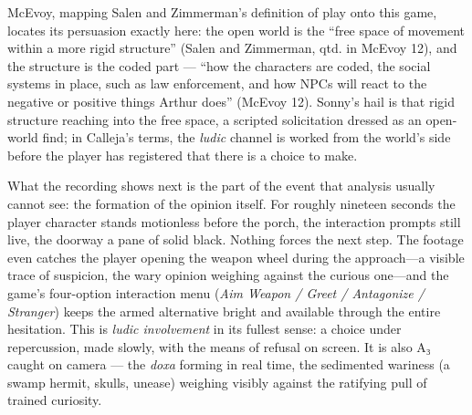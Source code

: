 \documentclass{article}
\begin{document}
McEvoy, mapping Salen and Zimmerman's definition of play onto this game, locates its persuasion exactly here: the open world is the ``free space of movement within a more rigid structure'' (Salen and Zimmerman, qtd. in McEvoy 12), and the structure is the coded part — ``how the characters are coded, the social systems in place, such as law enforcement, and how NPCs will react to the negative or positive things Arthur does'' (McEvoy 12). Sonny's hail is that rigid structure reaching into the free space, a scripted solicitation dressed as an open-world find; in Calleja's terms, the \textit{ludic} channel is worked from the world's side before the player has registered that there is a choice to make.

What the recording shows next is the part of the event that analysis usually cannot see: the formation of the opinion itself. For roughly nineteen seconds the player character stands motionless before the porch, the interaction prompts still live, the doorway a pane of solid black. Nothing forces the next step. The footage even catches the player opening the weapon wheel during the approach---a visible trace of suspicion, the wary opinion weighing against the curious one---and the game's four-option interaction menu (\textit{Aim Weapon / Greet / Antagonize / Stranger}) keeps the armed alternative bright and available through the entire hesitation. This is \textit{ludic involvement} in its fullest sense: a choice under repercussion, made slowly, with the means of refusal on screen. It is also A₃ caught on camera --- the \textit{doxa} forming in real time, the sedimented wariness (a swamp hermit, skulls, unease) weighing visibly against the ratifying pull of trained curiosity.
\end{document}
